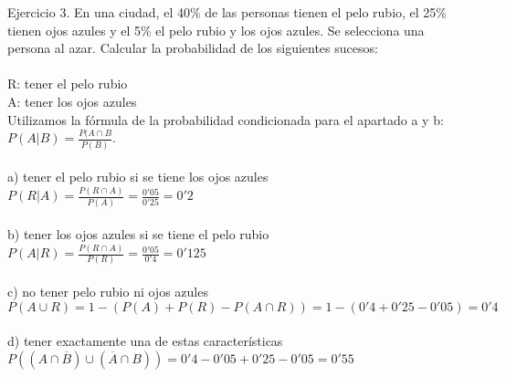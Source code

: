 \documentclass{article}
\begin{document}
Ejercicio 3. En una ciudad, el 40\% de las personas tienen el pelo rubio, el 25\% tienen ojos azules y el 5\% el pelo rubio y los ojos azules. Se selecciona una persona al azar. Calcular la probabilidad de los siguientes sucesos: \\ \\
R: tener el pelo rubio \\
A: tener los ojos azules \\
Utilizamos la fórmula de la probabilidad condicionada para el apartado a y b: $P(A|B) = \frac{P(A\cap B}{P(B)}$. \\ \\
a) tener el pelo rubio si se tiene los ojos azules \\
$P(R|A) = \frac{P(R \cap A)}{P(A)} = \frac{0'05}{0'25} = 0'2$ \\ \\
b) tener los ojos azules si se tiene el pelo rubio \\
$P(A|R) = \frac{P(R \cap A)}{P(R)} = \frac{0'05}{0'4} = 0'125$ \\ \\
c) no tener pelo rubio ni ojos azules \\ 
$P(A \cup R) = 1 - (P(A)+P(R)-P(A\cap R)) = 1 - (0'4+0'25-0'05) = 0'4 $ \\ \\
d) tener exactamente una de estas características \\
$P((A\cap \overline{B}) \cup (\overline{A} \cap B)) = 0'4 - 0'05 + 0'25 - 0'05 = 0'55 $ \\ 
\end{document}
